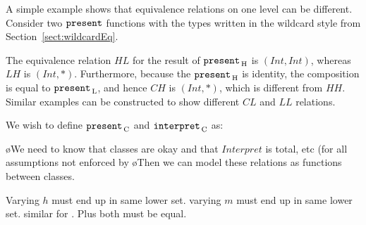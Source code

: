 
A simple example shows that equivalence relations on one level can be different. Consider two ${\tt present}$ functions with the types written in the wildcard style from Section~\ref{sect:wildcardEq}.


The equivalence relation $HL$ for the result of ${\tt present}_{\, \mathrm H}$ is $(Int,Int)$, whereas $LH$ is $(Int, *)$. Furthermore, because the ${\tt present}_{\, \mathrm H}$ is identity, the composition is equal to ${\tt present}_{\, \mathrm L}$, and hence $CH$ is $(Int,*)$, which is different from $HH$. Similar examples can be constructed to show different $CL$ and $LL$ relations.

We wish to define ${\tt present}_{\, \mathrm C}$ and ${\tt interpret}_{\, \mathrm C}$ as:



\toHere
\bl
\o We need to know that classes are okay and that $Interpret$ is total, etc (for all assumptions not enforced by 
\o Then we can model these relations as functions between classes.
\el

Varying $h$ must end up in same lower set. varying $m$ must end up in same lower set.
similar for \interpret. Plus both must be equal.
\fromHere

